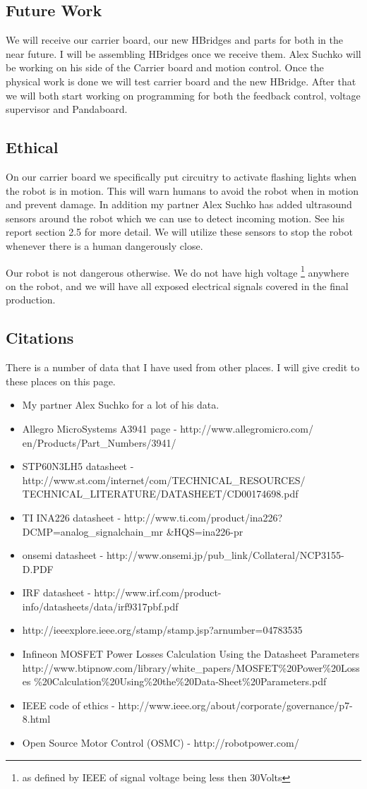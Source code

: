 \documentclass[12pt]{article}
\begin{document}
\subsection{Future Work}
We will receive our carrier board, our new HBridges and parts for both in the near future. I will be assembling HBridges once we receive them. Alex Suchko will be working on his side of the Carrier board and motion control. Once the physical work is done we will test carrier board and the new HBridge. After that we will both start working on programming for both the feedback control, voltage supervisor and Pandaboard.
\subsection{Ethical}
On our carrier board we specifically put circuitry to activate flashing lights when the robot is in motion. This will warn humans to avoid the robot when in motion and prevent damage. In addition my partner Alex Suchko has added ultrasound sensors around the robot which we can use to detect incoming motion. See his report section 2.5 for more detail. We will utilize these sensors to stop the robot whenever there is a human dangerously close.

Our robot is not dangerous otherwise. We do not have high voltage \footnote{as defined by IEEE of signal voltage being less then 30Volts} anywhere on the robot, and we will have all exposed electrical signals covered in the final production.
\subsection{Citations}
There is a number of data that I have used from other places. I will give credit to these places on this page.
\begin{itemize}
\item My partner Alex Suchko for a lot of his data.
\item Allegro MicroSystems A3941 page - http://www.allegromicro.com/ en/Products/Part\_Numbers/3941/
\item STP60N3LH5 datasheet - http://www.st.com/internet/com/TECHNICAL\_RESOURCES/ TECHNICAL\_LITERATURE/DATASHEET/CD00174698.pdf
\item TI INA226 datasheet - http://www.ti.com/product/ina226?DCMP=analog\_signalchain\_mr \&HQS=ina226-pr
\item onsemi datasheet - http://www.onsemi.jp/pub\_link/Collateral/NCP3155-D.PDF
\item IRF datasheet - http://www.irf.com/product-info/datasheets/data/irf9317pbf.pdf
\item http://ieeexplore.ieee.org/stamp/stamp.jsp?arnumber=04783535
\item Infineon MOSFET Power Losses Calculation Using the Datasheet Parameters http://www.btipnow.com/library/white\_papers/MOSFET\%20Power\%20Losses \%20Calculation\%20Using\%20the\%20Data-Sheet\%20Parameters.pdf
\item IEEE code of ethics - http://www.ieee.org/about/corporate/governance/p7-8.html
\item Open Source Motor Control (OSMC)  - http://robotpower.com/
\end{itemize}

 
\end{document}
